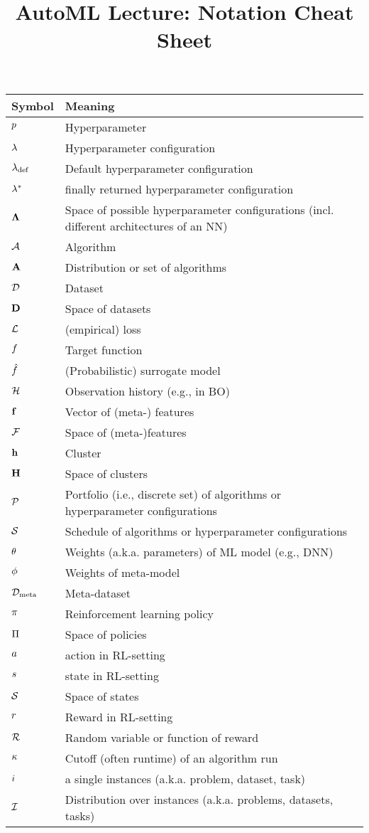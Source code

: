 \documentclass[]{report}
\title{AutoML Lecture: Notation Cheat Sheet}
\author{}
\date{}
\begin{document}
\maketitle

\begin{table}
	\begin{tabular}{ll}
		\toprule
		Symbol & Meaning \\
		\midrule
		$p$ & Hyperparameter \\
		$\mathbf{\lambda}$ & Hyperparameter configuration\\
		$\mathbf{\lambda}_{\text{def}}$ & Default hyperparameter configuration\\
		$\mathbf{\lambda}^*$ & finally returned hyperparameter configuration\\
		$\mathbf{\Lambda}$ &  Space of possible hyperparameter configurations (incl. different architectures of an NN)\\
		$\mathcal{A}$ & Algorithm \\
		$\mathbf{A}$ & Distribution or set of algorithms\\
		$\mathcal{D}$ & Dataset\\
		$\mathbf{D}$ & Space of datasets\\
		$\mathcal{L}$ & (empirical) loss\\
		\midrule 
		$f$ & Target function\\
		$\hat{f}$ & (Probabilistic) surrogate model \\
		$\mathcal{H}$ & Observation history (e.g., in BO)\\
		$\mathbf{f}$ & Vector of (meta-) features\\
		$\mathcal{F}$ & Space of (meta-)features \\
		$\mathbf{h}$ & Cluster \\
		$\mathbf{H}$ & Space of clusters\\
		$\mathcal{P}$ & Portfolio (i.e., discrete set) of algorithms or hyperparameter configurations\\
		$\mathcal{S}$ & Schedule of algorithms or hyperparameter configurations\\
		\midrule 
		$\theta$ & Weights (a.k.a. parameters) of ML model (e.g., DNN)\\
		$\phi$ & Weights of meta-model\\
    	$\mathcal{D}_{\text{meta}}$ & Meta-dataset\\
		\midrule 
		$\pi$ & Reinforcement learning policy\\
		$\Pi$ & Space of policies\\
		$a$ & action in RL-setting\\
		$s$ & state in RL-setting\\
		$\mathcal{S}$ & Space of states\\
		$r$ & Reward in RL-setting\\
		$\mathcal{R}$ & Random variable or function of reward\\
		\midrule
		$\kappa$ & Cutoff (often runtime) of an algorithm run\\
		$i$ & a single instances (a.k.a. problem, dataset, task)\\
		$\mathcal{I}$ & Distribution over instances (a.k.a. problems, datasets, tasks)\\
		\bottomrule
	\end{tabular}
\end{table}
\end{document}
